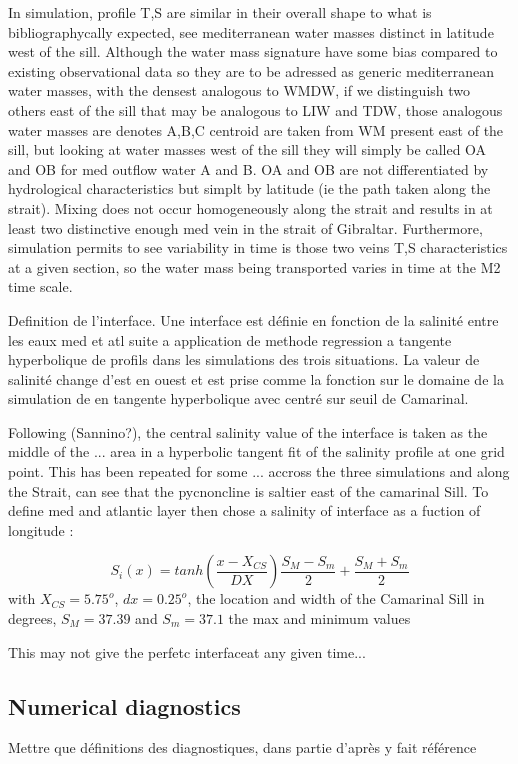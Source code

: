 In simulation, profile T,S are similar in their overall shape to what is bibliographycally expected, see mediterranean water masses distinct in latitude west of the sill.
Although the water mass signature have some bias compared to existing observational data so they are to be adressed as generic mediterranean water masses, with the densest analogous to WMDW, if we distinguish two others east of the sill that may be analogous to LIW and TDW, those analogous water masses are denotes A,B,C centroid are taken from WM present east of the sill, but looking at water masses west of the sill they will simply be called OA and OB for med outflow water A and B. OA and OB are not differentiated by hydrological characteristics but simplt by latitude (ie the path taken along the strait).
Mixing does not occur homogeneously along the strait and results in at least two distinctive enough med vein in the strait of Gibraltar. Furthermore, simulation permits to see variability in time is those two veins T,S characteristics at a given section, so the water mass being transported varies in time at the M2 time scale.

Definition de l'interface. Une interface est définie en fonction de la salinité entre les eaux med et atl suite a application de methode regression a tangente hyperbolique de profils dans les simulations des trois situations. La valeur de salinité change d'est en ouest et est prise comme la fonction sur le domaine de la simulation de en tangente hyperbolique avec centré sur seuil de Camarinal.


Following (Sannino?), the central salinity value of the interface is taken as the middle of the ... area in a hyperbolic tangent fit of the salinity profile at one grid point. This has been repeated for some ... accross the three simulations and along the Strait, can see that the pycnoncline is saltier east of the camarinal Sill. To define med and atlantic layer then chose a salinity of interface as a fuction of longitude :

\begin{equation}
	S_i(x)=tanh(\frac{x-X_{CS}}{DX})\frac{S_M-S_m}{2}+\frac{S_M+S_m}{2}
\end{equation}
with $X_{CS}=5.75^o$, $dx=0.25^o$, the location and width of the Camarinal Sill in degrees, $S_M=37.39$ and $S_m=37.1$ the max and minimum values

This may not give the perfetc interfaceat any given time...


\subsection{Numerical diagnostics}
Mettre que définitions des diagnostiques, dans partie d'après y fait référence



